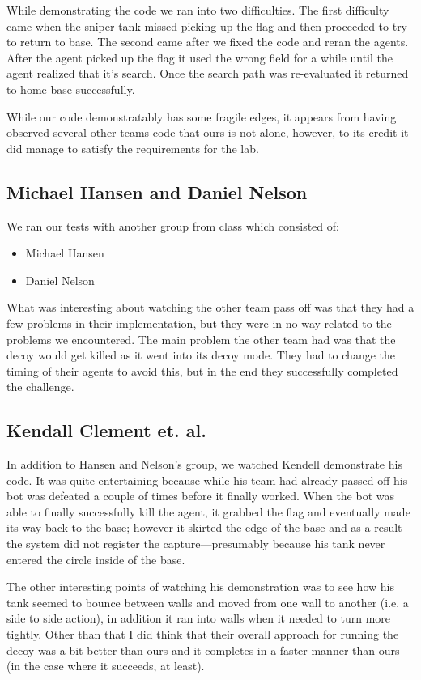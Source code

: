 While demonstrating the code we ran into two difficulties.  The first difficulty came when the sniper tank missed picking up the flag and then proceeded to try to return to base.  The second came after we fixed the code and reran the agents.  After the agent picked up the flag it used the wrong field for a while until the agent realized that it's search.  Once the search path was re-evaluated it returned to home base successfully.

While our code demonstratably has some fragile edges, it appears from having observed several other teams code that ours is not alone, however, to its credit it did manage to satisfy the requirements for the lab.

\subsection{Michael Hansen and Daniel Nelson}
We ran our tests with another group from class which consisted of:
\begin{itemize}
    \item{Michael Hansen}
    \item{Daniel Nelson}
\end{itemize}
What was interesting about watching the other team pass off was that they had a few problems in their implementation, but they were in no way related to the problems we encountered.  The main problem the other team had was that the decoy would get killed as it went into its decoy mode.  They had to change the timing of their agents to avoid this, but in the end they successfully completed the challenge.

\subsection{Kendall Clement et. al.}
In addition to Hansen and Nelson's group, we watched Kendell demonstrate his code.  It was quite entertaining because while his team had already passed off his bot was defeated a couple of times before it finally worked.  When the bot was able to finally successfully kill the agent, it grabbed the flag and eventually made its way back to the base; however it skirted the edge of the base and as a result the system did not register the capture---presumably because his tank never entered the circle inside of the base.

The other interesting points of watching his demonstration was to see how his tank seemed to bounce between walls and moved from one wall to another (i.e. a side to side action), in addition it ran into walls when it needed to turn more tightly.  Other than that I did think that their overall approach for running the decoy was a bit better than ours and it completes in a faster manner than ours (in the case where it succeeds, at least).
